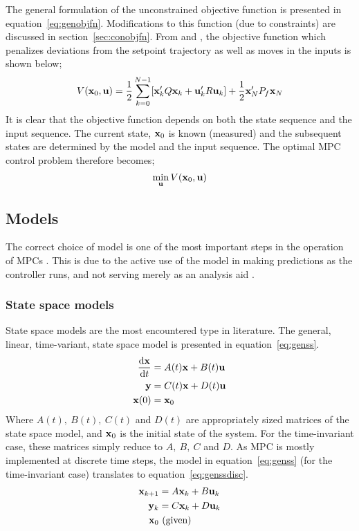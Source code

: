 The general formulation of the unconstrained objective function is presented in equation~\ref{eq:genobjfn}. 
Modifications to this function (due to constraints) are discussed in section~\ref{sec:conobjfn}. 
From \citet[17]{rawlings} and \citet[41]{maciejowskimpc}, the objective function which penalizes deviations from the setpoint trajectory as well as moves in the inputs is shown below;
\begin{equation}
  \label{eq:genobjfn}
  V({\bf {x}}_0,{\bf {u}})=\frac{1}{2}\sum^{N-1}_{k=0}[{\bf {x}}_k'Q{\bf {x}}_k + {\bf {u}}_k'R{\bf {u}}_k]
  + \frac{1}{2}{\bf {x}}_N'P_f{\bf {x}}_N
\end{equation}
It is clear that the objective function depends on both the state sequence and the input sequence. 
The current state, ${\bf {x}}_0$ is known (measured) and the subsequent states are determined by the model and the input sequence. 
The optimal MPC control problem therefore becomes;
\begin{equation}
  \label{eq:opctrlprob}
  \min_{{\bf {u}}} V({\bf {x}}_0,{\bf u})
\end{equation}

\subsection{Models}
The correct choice of model is one of the most important steps in the operation of MPCs \citep[17]{rossiter}.
This is due to the active use of the model in making predictions as the controller runs, and not serving merely as an analysis aid \citep[37]{maciejowskimpc}.

\subsubsection{State space models}
State space models are the most encountered type in literature.
The general, linear, time-variant, state space model is presented in equation~\ref{eq:genss}.
\begin{align}
  \label{eq:genss}
  \frac{\mathrm{d}{\bf {x}}}{\mathrm{d}t} &= A(t){\bf {x}} + B(t){\bf {u}} \notag \\
  {\bf {y}} &= C(t){\bf {x}} + D(t){\bf {u}} \\
  {\bf {x}}(0) &= {\bf {x}}_0 \notag
\end{align}
Where $A(t),~B(t),~C(t)$ and $D(t)$ are appropriately sized matrices of the state space model, and ${\bf {x}}_0$ is the initial state of the system.
For the time-invariant case, these matrices simply reduce to $A,~B,~C$ and $D$. 
As MPC is mostly implemented at discrete time steps, the model in equation~\ref{eq:genss} (for the time-invariant case) translates to equation~\ref{eq:genssdisc}.
\begin{align}
  \label{eq:genssdisc}
  {\bf {x}}_{k+1} &= A{\bf {x}}_k + B{\bf {u}}_k \notag \\
  {\bf {y}}_k &= C{\bf {x}}_k + D{\bf {u}}_k \\
  {\bf {x}}_0 &~ \text{(given)} \notag
\end{align}

